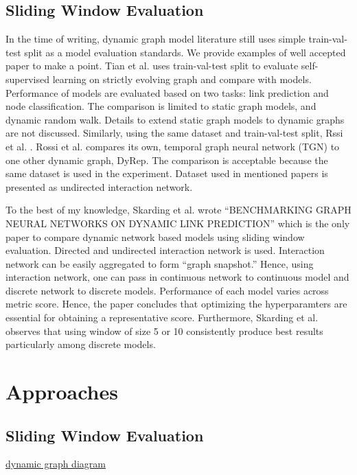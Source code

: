\documentclass{IEEEtran}
\begin{document}
\subsection{Sliding Window Evaluation}
\label{sec:org4121b19}

In the time of writing, dynamic graph model literature still uses simple train-val-test split as a model evaluation standards. We provide examples of well accepted paper to make a point. Tian et al. \cite{tian2021self} uses train-val-test split to evaluate self-supervised learning on strictly evolving graph and compare with models. Performance of models are evaluated based on two tasks: link prediction and node classification. The comparison is limited to static graph models, and dynamic random walk. Details to extend static graph models to dynamic graphs are not discussed. Similarly, using the same dataset and train-val-test split, Rssi et al. \cite{rossi2020temporal}. Rossi et al. compares its own, temporal graph neural network (TGN) to one other dynamic graph, DyRep. The comparison is acceptable because the same dataset is used in the experiment. Dataset used in mentioned papers is presented as undirected interaction network.

To the best of my knowledge, Skarding et al. wrote ``BENCHMARKING GRAPH NEURAL NETWORKS ON DYNAMIC LINK PREDICTION'' \cite{skarding2021benchmarking} which is the only paper to compare dynamic network based models using sliding window evaluation. Directed and undirected interaction network is used. Interaction network can be easily aggregated to form ``graph snapshot.'' Hence, using interaction network, one can pass in continuous network to continuous model and discrete network to discrete models. Performance of each model varies across metric score. Hence, the paper concludes that optimizing the hyperparamters are essential for obtaining a representative score. Furthermore, Skarding et al. observes that using window of size 5 or 10 consistently produce best results particularly among discrete models.

\section{Approaches}
\label{sec:org810af19}
\subsection{Sliding Window Evaluation}
\label{sec:orgee23f4b}
\href{images/dynamic-graph-diagram.png}{dynamic graph diagram}
\end{document}
